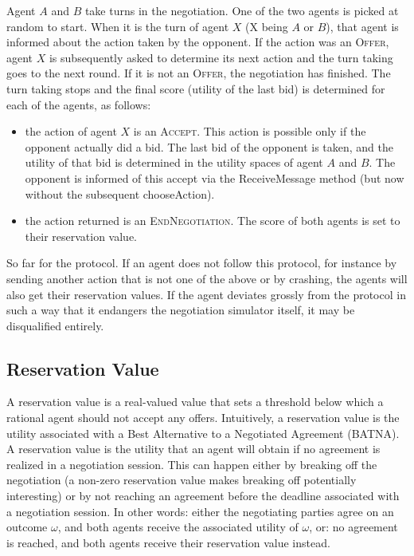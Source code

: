 \documentclass[]{article}
\newcommand\AI[1]{{}} \newcommand\ANAC[1]{{#1}}
\begin{document}
Agent $A$ and $B$ take turns in the negotiation. One of the two agents is picked at random to start. When it is the turn of agent $X$ (X being $A$ or $B$), that agent is informed about the action taken by the opponent. If the action was an \textsc{Offer}, agent $X$ is subsequently asked to determine its next action and the turn taking goes to the next round. If it is not an \textsc{Offer}, the negotiation has finished. The turn taking stops and the final score (utility of the last bid) is determined for each of the agents, as follows:
\begin{itemize}
	\item the action of agent $X$ is an \textsc{Accept}. This action is possible only if the opponent actually did a bid. The last bid of the opponent is taken, and the utility of that bid is determined in the utility spaces of agent $A$ and $B$. The opponent is informed of this accept via the ReceiveMessage method (but now without the subsequent chooseAction).
	\item the action returned is an \textsc{EndNegotiation}. The score of both agents is set to their reservation value.
\end{itemize}

So far for the protocol. If an agent does not follow this protocol, for instance by sending another action that is not one of the above or by crashing, the agents will also \ANAC{get their reservation values}\AI{score zero}. If the agent deviates grossly from the protocol in such a way that it endangers the negotiation simulator itself, it may be disqualified entirely.
 
\subsection{Reservation Value}

A reservation value is a real-valued value that sets a threshold below which a rational agent should not accept any offers. Intuitively, a reservation value is the utility associated with a Best Alternative to a Negotiated Agreement (BATNA). A reservation value is the utility that an agent will obtain if no agreement is realized in a negotiation session. This can happen either by breaking off the negotiation (a non-zero reservation value makes breaking off potentially interesting) or by not reaching an agreement before the deadline associated with a negotiation session. In other words: either the negotiating parties agree on an outcome $\omega$, and both agents receive the associated utility of $\omega$, or: no agreement is reached, and both agents receive their reservation value instead.
\end{document}
